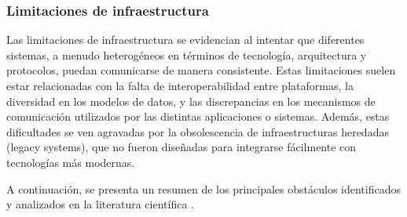     \subsubsection{Limitaciones de infraestructura}

    Las limitaciones de infraestructura se evidencian al intentar que diferentes sistemas, a menudo heterogéneos en términos de tecnología, arquitectura y protocolos, puedan comunicarse de manera consistente. 
    Estas limitaciones suelen estar relacionadas con la falta de interoperabilidad entre plataformas, la diversidad en los modelos de datos, y las discrepancias en los mecanismos de comunicación utilizados por las distintas aplicaciones o sistemas.
    Además, estas dificultades se ven agravadas por la obsolescencia de infraestructuras heredadas (legacy systems), 
    que no fueron diseñadas para integrarse fácilmente con tecnologías más modernas. 
    

    A continuación, se presenta un resumen de los principales obstáculos identificados y analizados en la literatura científica \cite{mcleod1980federated, reddy1994methodology, doan2012principles}.

